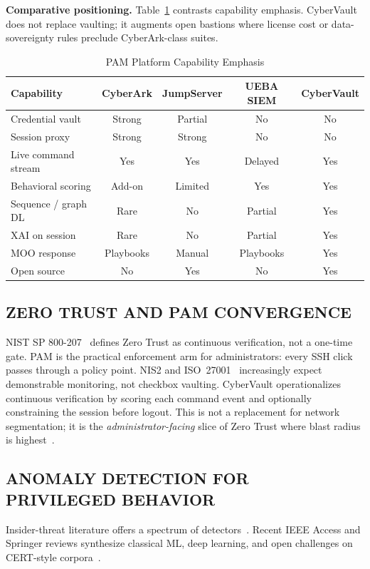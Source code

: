 \documentclass{ieeeaccess}
\begin{document}
\textbf{Comparative positioning.} Table~\ref{tab:pam-compare} contrasts capability emphasis. CyberVault does not replace vaulting; it augments open bastions where license cost or data-sovereignty rules preclude CyberArk-class suites.

\begin{table}[!t]
\caption{PAM Platform Capability Emphasis}
\label{tab:pam-compare}
\centering
\scriptsize
\begin{tabular*}{\textwidth}{@{\extracolsep{\fill}}lcccc@{}}
\toprule
\textbf{Capability} & CyberArk & JumpServer & UEBA SIEM & CyberVault \\
\midrule
Credential vault & Strong & Partial & No & No \\
Session proxy & Strong & Strong & No & No \\
Live command stream & Yes & Yes & Delayed & Yes \\
Behavioral scoring & Add-on & Limited & Yes & Yes \\
Sequence / graph DL & Rare & No & Partial & Yes \\
XAI on session & Rare & No & Partial & Yes \\
MOO response & Playbooks & Manual & Playbooks & Yes \\
Open source & No & Yes & No & Yes \\
\bottomrule
\end{tabular*}
\end{table}

\subsection{ZERO TRUST AND PAM CONVERGENCE}
NIST SP 800-207~\cite{ref22} defines Zero Trust as continuous verification, not a one-time gate. PAM is the practical enforcement arm for administrators: every SSH click passes through a policy point. NIS2 and ISO~27001~\cite{ref28,ref29} increasingly expect demonstrable monitoring, not checkbox vaulting. CyberVault operationalizes continuous verification by scoring each command event and optionally constraining the session before logout. This is not a replacement for network segmentation; it is the \textit{administrator-facing} slice of Zero Trust where blast radius is highest~\cite{ref21}.

\subsection{ANOMALY DETECTION FOR PRIVILEGED BEHAVIOR}
Insider-threat literature offers a spectrum of detectors~\cite{ref6,ref7,ref11,ref24,ref32,ref40,ref42,ref45}. Recent IEEE Access and Springer reviews synthesize classical ML, deep learning, and open challenges on CERT-style corpora~\cite{ref24,ref31,ref40,ref48}.
\end{document}

